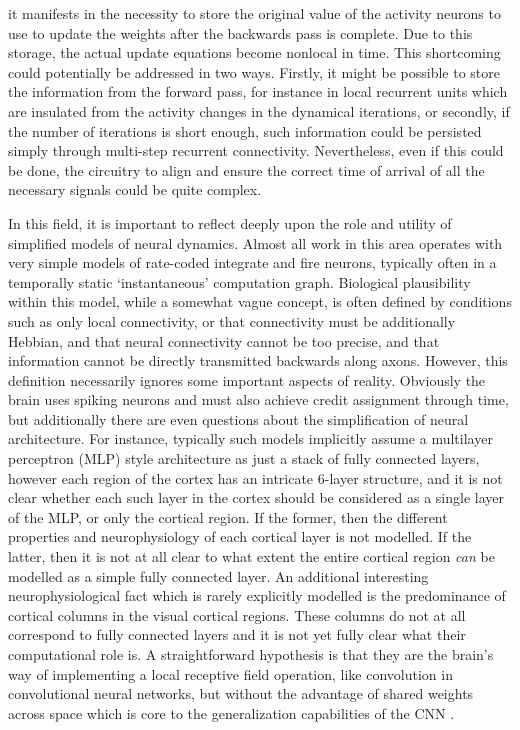 it manifests in the necessity to store the original value of the activity neurons to use to update the weights after the backwards pass is complete. Due to this storage, the actual update equations become nonlocal in time. This shortcoming could potentially be addressed in two ways. Firstly, it might be possible to store the information from the forward pass, for instance in local recurrent units which are insulated from the activity changes in the dynamical iterations, or secondly, if the number of iterations is short enough, such information could be persisted simply through multi-step recurrent connectivity. Nevertheless, even if this could be done, the circuitry to align and ensure the correct time of arrival of all the necessary signals could be quite complex.

In this field, it is important to reflect deeply upon the role and utility of simplified models of neural dynamics. Almost all work in this area operates with very simple models of rate-coded integrate and fire neurons, typically often in a temporally static `instantaneous' computation graph. Biological plausibility within this model, while a somewhat vague concept, is often defined by conditions such as only local connectivity, or that connectivity must be additionally Hebbian, and that neural connectivity cannot be too precise, and that information cannot be directly transmitted backwards along axons. However, this definition necessarily ignores some important aspects of reality. Obviously the brain uses spiking neurons and must also achieve credit assignment through time, but additionally there are even questions about the simplification of neural architecture. For instance, typically such models implicitly assume a multilayer perceptron (MLP) style architecture as just a stack of fully connected layers, however each region of the cortex has an intricate 6-layer structure, and it is not clear whether each such layer in the cortex should be considered as a single layer of the MLP, or only the cortical region. If the former, then the different properties and neurophysiology of each cortical layer is not modelled. If the latter, then it is not at all clear to what extent the entire cortical region \emph{can} be modelled as a simple fully connected layer. An additional interesting neurophysiological fact which is rarely explicitly modelled is the predominance of cortical columns in the visual cortical regions. These columns do not at all correspond to fully connected layers and it is not yet fully clear what their computational role is. A straightforward hypothesis is that they are the brain's way of implementing a local receptive field operation, like convolution in convolutional neural networks, but without the advantage of shared weights across space which is core to the generalization capabilities of the CNN \citep{hawkins2007intelligence}. 

